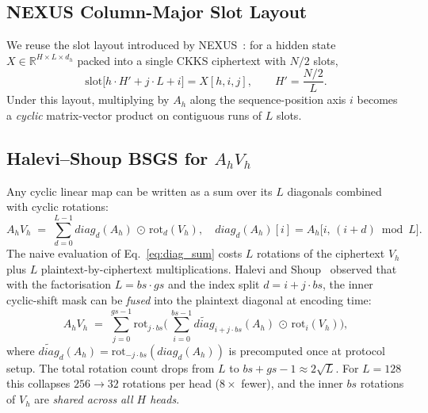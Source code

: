 \documentclass[11pt,a4paper]{article}
\newcommand{\rot}{\mathrm{rot}}
\newcommand{\diag}{\mathit{diag}}
\begin{document}
\subsection{NEXUS Column-Major Slot Layout}

We reuse the slot layout introduced by NEXUS~\cite{zhang2024nexus}: for a
hidden state $X \in \mathbb{R}^{H\times L\times d_h}$ packed into a single
CKKS ciphertext with $N/2$ slots,
\begin{equation}
\mathrm{slot}\bigl[h \cdot H' + j \cdot L + i\bigr] = X[h, i, j],
\qquad H' = \frac{N/2}{L}.
\label{eq:colmajor}
\end{equation}
Under this layout, multiplying by $A_h$ along the sequence-position
axis $i$ becomes a \emph{cyclic} matrix-vector product on contiguous
runs of $L$ slots.

\subsection{Halevi--Shoup BSGS for \texorpdfstring{$A_h V_h$}{A\_h V\_h}}
\label{sec:bsgs}

Any cyclic linear map can be written as a sum over its $L$ diagonals
combined with cyclic rotations:
\begin{equation}
A_h V_h \;=\; \sum_{d=0}^{L-1} \diag_d(A_h) \,\odot\, \rot_d(V_h),
\quad \diag_d(A_h)[i] = A_h\bigl[i,\,(i+d)\bmod L\bigr].
\label{eq:diag_sum}
\end{equation}
The naive evaluation of Eq.~\eqref{eq:diag_sum} costs $L$ rotations of
the ciphertext $V_h$ plus $L$ plaintext-by-ciphertext multiplications.
Halevi and Shoup~\cite{halevi2014bsgs} observed that with the
factorisation $L = bs \cdot gs$ and the index split
$d = i + j\cdot bs$, the inner cyclic-shift mask can be \emph{fused}
into the plaintext diagonal at encoding time:
\begin{equation}
A_h V_h \;=\; \sum_{j=0}^{gs-1} \rot_{j\cdot bs}\!\Biggl(\,
\sum_{i=0}^{bs-1} \widetilde{\diag}_{i+j\cdot bs}(A_h)
\,\odot\, \rot_i(V_h)\Biggr),
\label{eq:bsgs}
\end{equation}
where $\widetilde{\diag}_d(A_h) = \rot_{-j\cdot bs}(\diag_d(A_h))$
is precomputed once at protocol setup.  The total rotation count drops
from $L$ to $bs+gs-1 \approx 2\sqrt{L}$.  For $L=128$ this collapses
$256\to 32$ rotations per head ($8\times$ fewer), and the inner
$bs$ rotations of $V_h$ are \emph{shared across all $H$ heads}.
\end{document}
